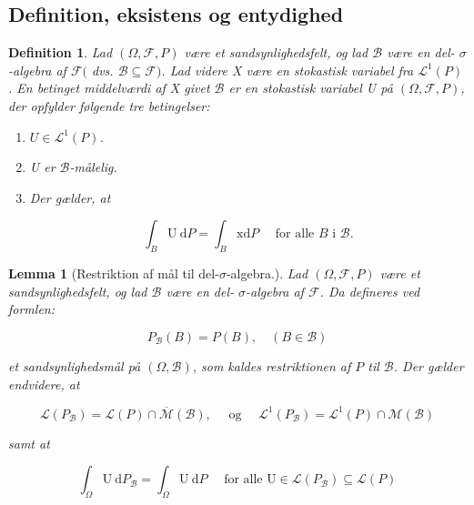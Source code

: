 \documentclass{article}
\newcommand{\1}{\mathbbm{1}}
\theoremstyle{boxed}
\newtheorem{definition}[theorem]{Definition}
\newtheorem{lemma}[theorem]{Lemma}
\begin{document}
\subsection{Definition, eksistens og entydighed}
\begin{theorem-box}
    \begin{definition}
        Lad $(\Omega, \mathcal{F}, P)$ være et sandsynlighedsfelt, og lad $\mathcal{B}$ være en del- $\sigma$-algebra af $\mathcal{F}($ dvs. $\mathcal{B} \subseteq \mathcal{F})$.
Lad videre X være en stokastisk variabel fra $\mathcal{L}^1(P)$.
En betinget middelværdi af X givet $\mathcal{B}$ er en stokastisk variabel U på $(\Omega, \mathcal{F}, P)$, der opfylder følgende tre betingelser:
\begin{enumerate}
    \item $U \in \mathcal{L}^1(P)$.
    \item U er $\mathcal{B}$-målelig.
    \item Der gælder, at

    $$
    \int_B \mathrm{U} \mathrm{~d} P=\int_B \mathrm{xd} P \quad \text { for alle } B \text { i } \mathcal{B} .
    $$
\end{enumerate}
    \end{definition}
\end{theorem-box}
\begin{theorem-box}
    \begin{lemma}[Restriktion af mål til del-$\sigma$-algebra.]
        Lad $(\Omega, \mathcal{F}, P)$ være et sandsynlighedsfelt, og lad $\mathcal{B}$ være en del- $\sigma$-algebra af $\mathcal{F}$. Da defineres ved formlen:

$$
P_{\mathcal{B}}(B)=P(B), \quad(B \in \mathcal{B})
$$

et sandsynlighedsmål på $(\Omega, \mathcal{B})$, som kaldes restriktionen af $P$ til $\mathcal{B}$.
Der gælder endvidere, at

$$
\mathcal{L}\left(P_{\mathcal{B}}\right)=\mathcal{L}(P) \cap \overline{\mathcal{M}}(\mathcal{B}), \quad \text { og } \quad \mathcal{L}^1\left(P_{\mathcal{B}}\right)=\mathcal{L}^1(P) \cap \mathcal{M}(\mathcal{B})
$$

samt at

$$
\int_{\Omega} \mathrm{U} \mathrm{~d} P_{\mathcal{B}}=\int_{\Omega} \mathrm{U} \mathrm{~d} P \quad \text { for alle } \mathrm{U} \in \mathcal{L}\left(P_{\mathcal{B}}\right) \subseteq \mathcal{L}(P)
$$
    \end{lemma}
\end{theorem-box}
\end{document}
